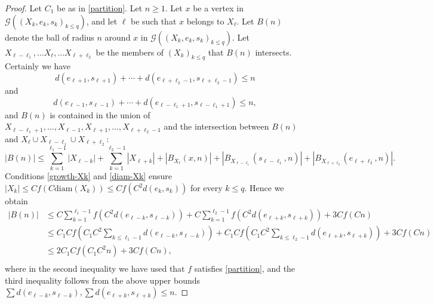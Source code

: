 \documentclass[11pt]{amsart}
\newcommand{\R}{\ensuremath{\mathbb{R}}}%
\newcommand{\vol}{\ensuremath{\operatorname{vol}}}%
\theoremstyle{definition}
\newtheorem{defin}{Definition}[section]
\theoremstyle{plain}
\theoremstyle{remark}
\begin{document}
\begin{proof}
	Let $C_1$ be as in \eqref{partition}. Let $n \geq 1$. Let $x$ be a vertex in $\mathcal{G}((X_k,e_k,s_k)_{k \leq q})$, and let $\ell$ be such that $x$ belongs to $X_\ell$. Let $B(n)$ denote the ball of radius $n$ around $x$ in $\mathcal{G}((X_k,e_k,s_k)_{k \leq q})$. Let $X_{\ell - \ell_1}, \ldots X_\ell, \ldots X_{\ell + \ell_2}$ be the members of $(X_k)_{k \leq q}$ that $B(n)$ intersects. Certainly we have \[ d(e_{\ell+1},s_{\ell+1}) +   \cdots + d(e_{\ell + \ell_2 - 1},s_{\ell + \ell_2 - 1}) \leq n  \] and \[ d(e_{\ell-1},s_{\ell-1}) +   \cdots + d(e_{\ell - \ell_1 + 1},s_{\ell - \ell_1 + 1}) \leq n,  \] and $B(n)$ is contained in the union of $X_{\ell - \ell_1+1}, \ldots, X_{\ell-1}, X_{\ell+1}, \ldots, X_{\ell + \ell_2-1}$ and the intersection between $B(n)$ and $X_\ell \cup X_{\ell - \ell_1} \cup X_{\ell + \ell_2}$: \[ |B(n)| \leq \sum_{k=1}^{\ell_1-1} |X_{\ell-k}| + \sum_{k=1}^{\ell_2-1} |X_{\ell+k}| + |B_{X_{\ell}}(x,n)|  + |B_{X_{\ell - \ell_1}}(s_{\ell - \ell_1},n)| + |B_{X_{\ell + \ell_2}}(e_{\ell + \ell_2},n)|. \]  Conditions  \ref{growth-Xk} and \ref{diam-Xk} ensure $|X_k| \leq C f(C \mathrm{diam}(X_k)) \leq C f(C^2d(e_k,s_k))$ for every $k \leq q$. Hence we obtain \begin{align*}  |B(n)| & \leq C \sum_{k=1}^{\ell_1-1} f(C^2 d(e_{\ell-k},s_{\ell-k})) + C \sum_{k=1}^{\ell_2-1} f(C^2d(e_{\ell+k},s_{\ell+k})) + 3Cf(Cn) \\ & \leq C_1 C f \left(C_1 C^2 \sum_{k \leq \ell_1-1} d(e_{\ell-k},s_{\ell-k}) \right) +  C_1 C f \left(C_1 C^2 \sum_{k \leq \ell_2-1} d(e_{\ell+k},s_{\ell+k}) \right) + 3Cf(Cn) \\ & \leq 2C_1 C f(C_1 C^2n) + 3Cf(Cn),\\
	\end{align*}
	where in the second inequality we have used that $f$ satisfies \eqref{partition}, and the third inequality follows from the above upper bounds $\sum d(e_{\ell-k},s_{\ell-k}), \sum d(e_{\ell+k},s_{\ell+k}) \leq n $.
\end{proof}

\end{document}
